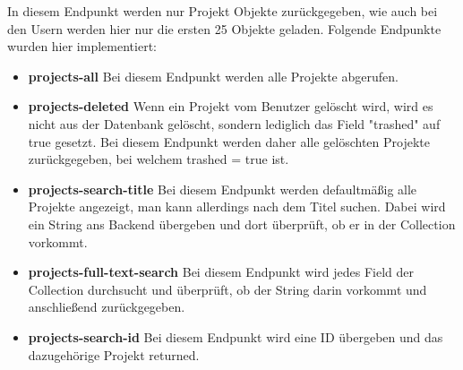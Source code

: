 In diesem Endpunkt werden nur Projekt Objekte zurückgegeben, wie auch bei den Usern werden hier nur die ersten 25 Objekte geladen. Folgende Endpunkte wurden hier implementiert:
\begin{itemize}
    \item \textbf{projects-all}
        \newline
        Bei diesem Endpunkt werden alle Projekte abgerufen.
    \item \textbf{projects-deleted}
        \newline
        Wenn ein Projekt vom Benutzer gelöscht wird, wird es nicht aus der Datenbank gelöscht, sondern lediglich das Field "trashed" auf true gesetzt. Bei diesem Endpunkt werden daher alle gelöschten Projekte zurückgegeben, bei welchem trashed = true ist.
    \item \textbf{projects-search-title}
        \newline
        Bei diesem Endpunkt werden defaultmäßig alle Projekte angezeigt, man kann allerdings nach dem Titel suchen. Dabei wird ein String ans Backend übergeben und dort überprüft, ob er in der Collection vorkommt.
    \item \textbf{projects-full-text-search}
        \newline
        Bei diesem Endpunkt wird jedes Field der Collection durchsucht und überprüft, ob der String darin vorkommt und anschließend zurückgegeben.
    \item \textbf{projects-search-id}
        \newline
        Bei diesem Endpunkt wird eine ID übergeben und das dazugehörige Projekt returned.
\end{itemize}